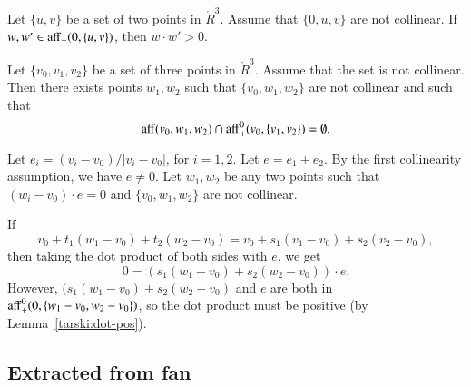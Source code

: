 \begin{tarskidata}
\begin{tarski}
\begin{lemma}
Let $\{u,v\}$ be a set of two points in $\ring{R}^3$.
Assume that $\{0,u,v\}$ are not collinear.
If $w,w'\in{\operatorname{aff}}_+(0,\{u,v\})$, then
$w\cdot w' > 0$.
\end{lemma}

\begin{proved}
\swallowed\end{proved}
\end{tarski}



\begin{tarski}

\begin{lemma}
Let $\{v_0,v_1,v_2\}$ be a set of three points in $\ring{R}^3$.
Assume that the set is not collinear.  Then there exists points
$w_1,w_2$ such that $\{v_0,w_1,w_2\}$ are not collinear and such
that 
   $$
   {\operatorname{aff}}(v_0,w_1,w_2)\cap {\operatorname{aff}}_+^0(v_0,\{v_1,v_2\})=\emptyset .
   $$
\end{lemma}

\begin{proved}
Let $e_i = (v_i-v_0)/|v_i-v_0|$, for $i=1,2$. Let 
$e = e_1+e_2$.  By the first collinearity assumption, we have
$e\ne 0$.  Let $w_1,w_2$ be any two points such that
$(w_i-v_0)\cdot e = 0$ and $\{v_0,w_1,w_2\}$ are not collinear.

If 
 $$
 v_0 + t_1 (w_1-v_0) + t_2 (w_2-v_0)=v_0 + s_1 (v_1-v_0) + s_2 (v_2-v_0),
 $$
then taking the dot product of both sides with $e$, we get
$$
  0 = (s_1 (w_1-v_0) + s_2 (w_2-v_0))\cdot e.
$$
However, $(s_1 (w_1-v_0) + s_2 (w_2-v_0)$ and $e$ are both
in ${\operatorname{aff}}_+^0(0,\{w_1-v_0,w_2-v_0\})$, so the dot product
must be positive (by Lemma~\ref{tarski:dot-pos}).
\swallowed\end{proved}
\end{tarski}






\begin{tarski}
\section{Extracted from fan}


\end{tarski}
\end{tarskidata}
